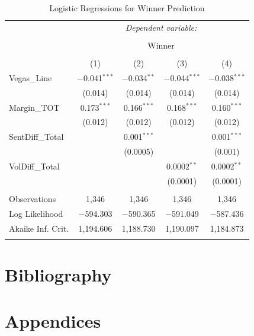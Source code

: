 \documentclass[12pt]{article}
\begin{document}
\begin{doublespacing}
\begin{table}[H] 
\centering 
\caption{Logistic Regressions for Winner Prediction} 
\label{table:winnerprediction} 
\begin{tabular*}{\textwidth}{@{\extracolsep{\fill}}lcccc} 
\hline 
\hline
 & \multicolumn{4}{c}{\textit{Dependent variable:}} \\ 
\cline{2-5} 
\\[-3.0ex] & \multicolumn{4}{c}{Winner} \\ 
\\[-1.5ex] & (1) & (2) & (3) & (4)\\ 
\hline
 Vegas\_Line & $-$0.041$^{***}$ & $-$0.034$^{**}$ & $-$0.044$^{***}$ & $-$0.038$^{***}$ \\ 
  & (0.014) & (0.014) & (0.014) & (0.014) \\ 
 Margin\_TOT & 0.173$^{***}$ & 0.166$^{***}$ & 0.168$^{***}$ & 0.160$^{***}$ \\ 
  & (0.012) & (0.012) & (0.012) & (0.012) \\ 
 SentDiff\_Total &  & 0.001$^{***}$ &  & 0.001$^{***}$ \\ 
  &  & (0.0005) &  & (0.001) \\ 
 VolDiff\_Total &  &  & 0.0002$^{**}$ & 0.0002$^{**}$ \\ 
  &  &  & (0.0001) & (0.0001) \\ 
\hline \\[-1.8ex] 
Observations & 1,346 & 1,346 & 1,346 & 1,346 \\ 
Log Likelihood & $-$594.303 & $-$590.365 & $-$591.049 & $-$587.436 \\ 
Akaike Inf. Crit. & 1,194.606 & 1,188.730 & 1,190.097 & 1,184.873 \\
\hline 
\hline \\[-1.8ex] 
\end{tabular*} 
\end{table}  

\newpage

\section{Bibliography}

\newpage

\section{Appendices}


\end{doublespacing}
\end{document}
